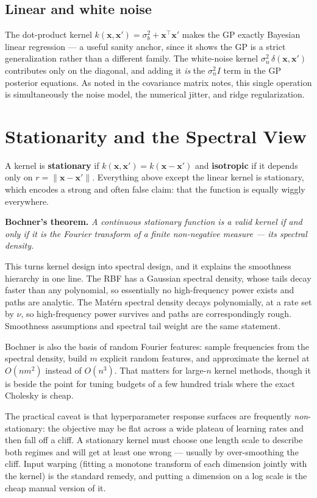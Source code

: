 \documentclass[conference]{IEEEtran}
\begin{document}
\subsection*{Linear and white noise}
The dot-product kernel $k(\mathbf{x},\mathbf{x}') = \sigma_b^2 + \mathbf{x}^{\!\top}\mathbf{x}'$ makes the GP exactly Bayesian linear regression --- a useful sanity anchor, since it shows the GP is a strict generalization rather than a different family. The white-noise kernel $\sigma_n^2\,\delta(\mathbf{x},\mathbf{x}')$ contributes only on the diagonal, and adding it \textit{is} the $\sigma_n^2 I$ term in the GP posterior equations. As noted in the covariance matrix notes, this single operation is simultaneously the noise model, the numerical jitter, and ridge regularization.

\section*{Stationarity and the Spectral View}
A kernel is \textbf{stationary} if $k(\mathbf{x},\mathbf{x}') = k(\mathbf{x}-\mathbf{x}')$ and \textbf{isotropic} if it depends only on $r = \|\mathbf{x}-\mathbf{x}'\|$. Everything above except the linear kernel is stationary, which encodes a strong and often false claim: that the function is equally wiggly everywhere.

\medskip
\noindent\textbf{Bochner's theorem.}
\textit{A continuous stationary function is a valid kernel if and only if it is the Fourier transform of a finite non-negative measure --- its spectral density.}

\medskip
This turns kernel design into spectral design, and it explains the smoothness hierarchy in one line. The RBF has a Gaussian spectral density, whose tails decay faster than any polynomial, so essentially no high-frequency power exists and paths are analytic. The Mat\'ern spectral density decays polynomially, at a rate set by $\nu$, so high-frequency power survives and paths are correspondingly rough. Smoothness assumptions and spectral tail weight are the same statement.

Bochner is also the basis of random Fourier features: sample frequencies from the spectral density, build $m$ explicit random features, and approximate the kernel at $O(nm^2)$ instead of $O(n^3)$. That matters for large-$n$ kernel methods, though it is beside the point for tuning budgets of a few hundred trials where the exact Cholesky is cheap.

The practical caveat is that hyperparameter response surfaces are frequently \textit{non}-stationary: the objective may be flat across a wide plateau of learning rates and then fall off a cliff. A stationary kernel must choose one length scale to describe both regimes and will get at least one wrong --- usually by over-smoothing the cliff. Input warping (fitting a monotone transform of each dimension jointly with the kernel) is the standard remedy, and putting a dimension on a log scale is the cheap manual version of it.
\end{document}
